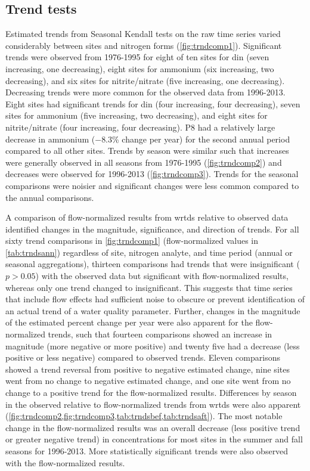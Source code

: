 \documentclass[letterpaper,12pt,oneside]{article}\usepackage[]{graphicx}\usepackage[]{color}
\begin{document}
\subsection{Trend tests}



Estimated trends from Seasonal Kendall tests on the raw time series varied considerably between sites and nitrogen forms (\cref{fig:trndcomp1}). Significant trends were observed from 1976-1995 for eight of ten sites for \ac{din} (seven increasing, one decreasing), eight sites for ammonium (six increasing, two decreasing), and six sites for nitrite/nitrate (five increasing, one decreasing).  Decreasing trends were more common for the observed data from 1996-2013.  Eight sites had significant trends for \ac{din} (four increasing, four decreasing), seven sites for ammonium (five increasing, two decreasing), and eight sites for nitrite/nitrate (four increasing, four decreasing). P8 had a relatively large decrease in ammonium ($-8.3$\% change per year) for the second annual period compared to all other sites. Trends by season were similar such that increases were generally observed in all seasons from 1976-1995 (\cref{fig:trndcomp2}) and decreases were observed for 1996-2013 (\cref{fig:trndcomp3}).  Trends for the seasonal comparisons were noisier and significant changes were less common compared to the annual comparisons.


A comparison of flow-normalized results from \ac{wrtds} relative to observed data identified changes in the magnitude, significance, and direction of trends. For all sixty trend comparisons in \cref{fig:trndcomp1} (flow-normalized values in \cref{tab:trndsann}) regardless of site, nitrogen analyte, and time period (annual or seasonal aggregations), thirteen comparisons had trends that were insignificant ($p > 0.05$) with the observed data but significant with flow-normalized results, whereas only one trend changed to insignificant. This suggests that time series that include flow effects had sufficient noise to obscure or prevent identification of an actual trend of a water quality parameter. Further, changes in the magnitude of the estimated percent change per year were also apparent for the flow-normalized trends, such that fourteen comparisons showed an increase in magnitude (more negative or more positive) and twenty five had a decrease (less positive or less negative) compared to observed trends.  Eleven comparisons showed a trend reversal from positive to negative estimated change, nine sites went from no change to negative estimated change, and one site went from no change to a positive trend for the flow-normalized results. Differences by season in the observed relative to flow-normalized trends from \ac{wrtds} were also apparent (\cref{fig:trndcomp2,fig:trndcomp3,tab:trndsbef,tab:trndsaft}). The most notable change in the flow-normalized results was an overall decrease (less positive trend or greater negative trend) in concentrations for most sites in the summer and fall seasons for 1996-2013.  More statistically significant trends were also observed with the flow-normalized results.
\end{document}
